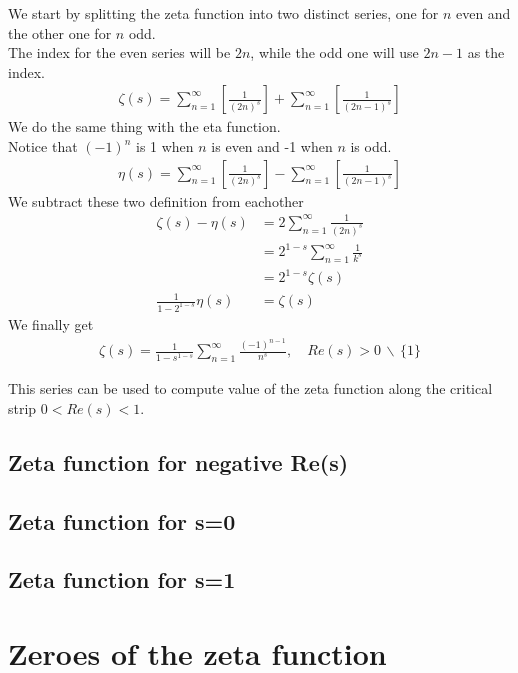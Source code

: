 \documentclass{article}
\newcommand{\exceptone}{
    \,\backslash\,\{1\}
}
\begin{document}
We start by splitting the zeta function into two distinct series, one for $n$ even and the other one for $n$ odd.
\\
The index for the even series will be $2n$, while the odd one will use $2n-1$ as the index.
\begin{align*}
    \zeta(s)=
    \sum_{n=1}^{\infty}\left[\frac{1}{(2n)^s}\right]+
    \sum_{n=1}^{\infty}\left[\frac{1}{(2n-1)^s}\right]
\end{align*}
We do the same thing with the eta function.
\\
Notice that $(-1)^n$ is 1 when $n$ is even and -1 when $n$ is odd.
\begin{align*}
    \eta(s)=
    \sum_{n=1}^{\infty}\left[\frac{1}{(2n)^s}\right]-
    \sum_{n=1}^{\infty}\left[\frac{1}{(2n-1)^s}\right]
\end{align*}
We subtract these two definition from eachother
\begin{align*}
    \zeta(s)-\eta(s)&=
    2\sum_{n=1}^{\infty}\frac{1}{(2n)^s}
    \\
    &=2^{1-s}\sum_{n=1}^{\infty}\frac{1}{k^s}
    \\
    &=2^{1-s}\zeta(s)
    \\
    \frac{1}{1-2^{1-s}}\eta(s)&=\zeta(s)
\end{align*}
We finally get
\begin{align*}
    \zeta(s)=\frac{1}{1-s^{1-s}}\sum_{n=1}^{\infty}\frac{(-1)^{n-1}}{n^s},
    \quad Re(s)>0\exceptone
\end{align*}

This series can be used to compute value of the zeta function along the critical strip $0<Re(s)<1$.

\subsection{Zeta function for negative Re(s)}

\subsection{Zeta function for s=0}

\subsection{Zeta function for s=1}

\pagebreak

\section{Zeroes of the zeta function}
\end{document}
